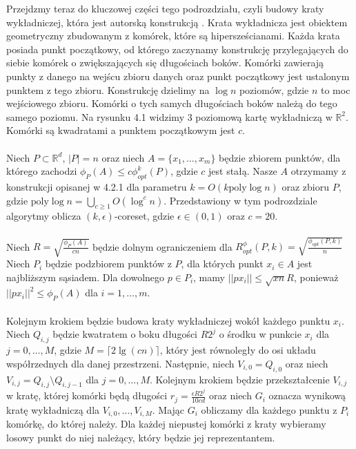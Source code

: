 Przejdzmy teraz do kluczowej części tego podrozdziału, czyli budowy kraty wykładniczej, która jest autorską konstrukcją \cite{10.1145/1007352.1007400}.
Krata wykładnicza jest obiektem geometryczny zbudowanym z komórek, które są hipersześcianami.
Każda krata posiada punkt początkowy, od którego zaczynamy konstrukcję przylegających do siebie komórek o zwiększających się długościach boków.
Komórki zawierają punkty z danego na wejścu zbioru danych oraz punkt początkowy jest ustalonym punktem z tego zbioru.
Konstrukcję dzielimy na $\log n$ poziomów, gdzie $n$ to moc wejściowego zbioru.
Komórki o tych samych długościach boków należą do tego samego poziomu.
Na rysunku 4.1 widzimy 3 poziomową kartę wykładniczą w $\mathbb{R}^2$.
Komórki są kwadratami a punktem początkowym jest $c$.
\\~\\
Niech $P \subset \mathbb{R}^d$, $|P| = n$ oraz niech $A = \{x_{1}, \dots, x_{m}\}$ będzie zbiorem punktów, dla którego zachodzi $\phi_{P}(A) \leq c\phi_{opt}^{k}(P)$, gdzie $c$ jest stałą.
Nasze $A$ otrzymamy z konstrukcji opisanej w 4.2.1 dla parametru $k = O(k \text{poly} \log n)$ oraz zbioru $P$, gdzie $\text{poly} \log n = \bigcup_{c \geq 1} O(\log^{c}n)$.
Przedstawiony w tym podrozdziale algorytmy oblicza $(k, \epsilon)$-coreset, gdzie $\epsilon \in (0,1)$ oraz $c = 20$.
\\~\\
Niech $R = \sqrt{\frac{\phi_{P}(A)}{cn}}$ będzie dolnym ograniczeniem dla $R_{opt}^{\phi}(P, k) = \sqrt{\frac{\phi_{opt}(P, k)}{n}}$
Niech $P_{i}$ będzie podzbiorem punktów z $P$, dla których punkt $x_{i} \in A$ jest najbliższym sąsiadem. 
Dla dowolnego $p \in P_{i}$, mamy $||px_{i}|| \leq \sqrt{xn}R$, ponieważ $||px_{i}||^{2} \leq \phi_{P}(A)$ dla $i = 1, \dots, m$.
\\~\\
Kolejnym krokiem będzie budowa kraty wykładniczej wokół każdego punktu $x_{i}$.
Niech $Q_{i,j}$ będzie kwatratem o boku długości $R2^{j}$ o środku w punkcie $x_{i}$ dla $j = 0, \dots, M$, gdzie $M = \lceil 2 \lg(cn) \rceil$, który jest równoległy do osi układu współrzednych dla danej przestrzeni.
Następnie, niech $V_{i, 0} = Q_{i, 0}$ oraz niech $V_{i,j} = Q_{i,j} \setminus Q_{i,j-1}$ dla $j = 0, \dots, M$.
Kolejnym krokiem będzie przekształcenie $V_{i,j}$ w kratę, której komórki będą długości $r_{j} = \frac{\epsilon R2^{j}}{10cd}$ oraz niech $G_{i}$ oznacza wynikową kratę wykładniczą dla $V_{i,0}, \dots, V_{i,M}$.
Mając $G_{i}$ obliczamy dla każdego punktu z $P_{i}$ komórkę, do której należy.
Dla każdej niepustej komórki z kraty wybieramy losowy punkt do niej należący, który będzie jej reprezentantem.
